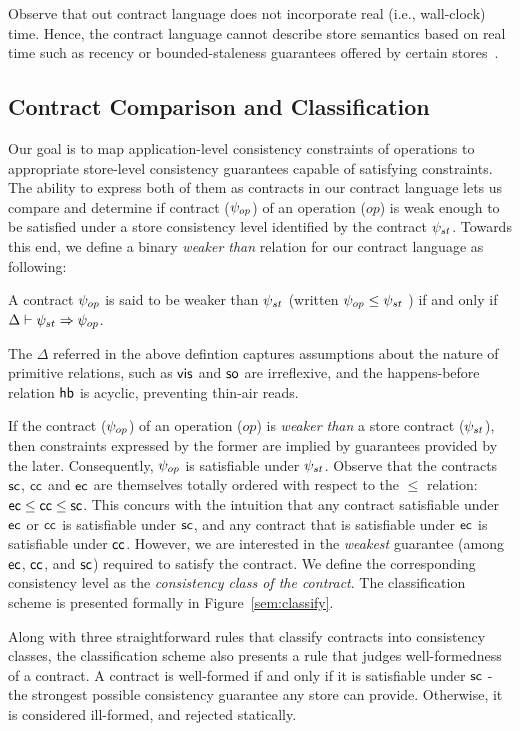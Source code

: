 Observe that out contract language does not incorporate real (i.e.,
wall-clock) time. Hence, the contract language cannot describe store
semantics based on real time such as recency or bounded-staleness
guarantees offered by certain stores~\cite{Pileus}.




\subsection{Contract Comparison and Classification}

Our goal is to map application-level consistency constraints of
operations to appropriate store-level consistency guarantees capable
of satisfying constraints.  The ability to express both of them as
contracts in our contract language lets us compare and determine if
contract ($\psi_{op}$) of an operation ($op$) is weak enough to be
satisfied under a store consistency level identified by the contract
$\psi_{st}$. Towards this end, we define a binary \emph{weaker than}
relation for our contract language as following:
\begin{definition}
A contract $\psi_{op}$ is said to be weaker than $\psi_{st}$ (written $\psi_{op}
\le \psi_{st}$ ) if and only if $\Delta \vdash \psi_{st} \Rightarrow \psi_{op}$.
\begin{center}
\end{center}
\end{definition}

\vspace{-2em} \noindent The $\Delta$ referred in the above defintion captures
assumptions about the nature of primitive relations, such as ${\normalfont \textsf{vis}}$
and ${\normalfont \textsf{so}}$ are irreflexive, and the happens-before relation ${\normalfont \textsf{hb}}$ is
acyclic, preventing thin-air reads. 

If the contract ($\psi_{op}$) of an operation ($op$) is \emph{weaker
than} a store contract ($\psi_{st}$), then constraints expressed by the
former are implied by guarantees provided by the later. Consequently,
$\psi_{op}$ is satisfiable under $\psi_{st}$. Observe that the contracts
${\sf sc}$, ${\sf cc}$ and ${\sf ec}$ are themselves totally ordered with respect
to the $\le$ relation: ${\sf ec} \le {\sf cc} \le {\sf sc}$.  This concurs with
the intuition that any contract satisfiable under ${\sf ec}$ or ${\sf cc}$ is
satisfiable under ${\sf sc}$, and any contract that is satisfiable under
${\sf ec}$ is satisfiable under ${\sf cc}$. However, we are interested in the
\emph{weakest} guarantee (among ${\sf ec}$, ${\sf cc}$, and ${\sf sc}$) required
to satisfy the contract. We define the corresponding consistency level
as the \emph{consistency class of the contract}. The classification
scheme is presented formally in Figure~\ref{sem:classify}.  

Along with three straightforward rules that classify contracts into
consistency classes, the classification scheme also presents a rule
that judges well-formedness of a contract. A contract is well-formed
if and only if it is satisfiable under ${\sf sc}$ - the strongest possible
consistency guarantee any store can provide. Otherwise, it is
considered ill-formed, and rejected statically.
